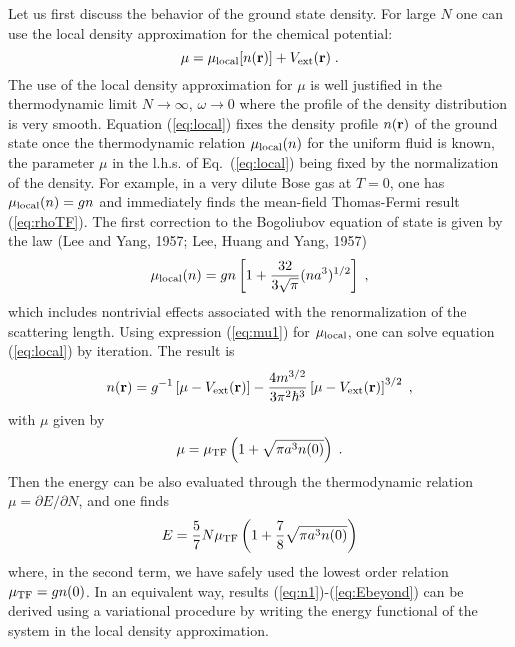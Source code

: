 Let us first discuss the behavior of the ground state density. For
large $N$ one can use the local density approximation for the chemical
potential:
\begin{equation}
\mu = \mu_{\rm local} [n({\bf r})] + V_{\rm ext}({\bf r}) \; .
\label{eq:local}
\end{equation}
The use of the local density approximation for $\mu$ is well justified 
in the thermodynamic limit $N\to \infty$, $\omega\to 0$  where the
profile of the density distribution is very smooth.  Equation
(\ref{eq:local}) fixes the density profile $n({\bf r})$ of the ground 
state once the thermodynamic relation $\mu_{\rm local}(n)$ for the uniform 
fluid is known, the parameter $\mu$ in the l.h.s. of Eq.~(\ref{eq:local})
being fixed by the normalization of the density. For example, in a very 
dilute Bose gas at $T=0$, one has $\mu_{\rm local}(n) =g n$ and immediately
finds the mean-field Thomas-Fermi result (\ref{eq:rhoTF}).  The first 
correction to the Bogoliubov equation of state is given by the law 
(Lee and Yang, 1957; Lee, Huang and Yang, 1957)
\begin{equation}
\mu_{\rm local}(n) = gn \left[ 1+\frac{32}{3\sqrt{\pi }}(na^3)^{1/2} \right]
\; , 
\label{eq:mu1}
\end{equation}
which includes nontrivial effects associated with the renormalization 
of the scattering length. Using expression (\ref{eq:mu1}) for 
$\mu_{\rm local}$, one can solve equation (\ref{eq:local}) by iteration.
The result is  
\begin{equation}
n({\bf r}) = g^{-1} \left[ \mu - V_{\rm ext}({\bf r}) \right] -
\frac{4m^{3/2}}{3\pi^2\hbar^3} 
\left[ \mu-V_{\rm ext}({\bf r})\right]^{3/2} \; , 
\label{eq:n1}
\end{equation}
with $\mu$ given by 
\begin{equation}
\mu = \mu_{\rm TF} \left( 1 + \sqrt{\pi a^3 n(0)} \right) \; . 
\label{eq:mubeyond}
\end{equation}
Then the energy can be also evaluated through the thermodynamic 
relation $\mu=\partial E/\partial N$, and one finds
\begin{equation}
E = \frac{5}{7}N\mu_{\rm TF} \left(1+\frac{7}{8}
\sqrt{\pi a^3n(0)}\right)
\label{eq:Ebeyond}
\end{equation}
where, in the second term, we have safely used the lowest order 
relation $\mu_{\rm TF}=gn(0)$. In an equivalent way, results 
(\ref{eq:n1})-(\ref{eq:Ebeyond}) can be derived  using a variational 
procedure by writing the energy functional of the system in the local 
density  approximation.  

